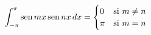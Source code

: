 \item $\displaystyle\int_{-\pi}^{\pi} \operatorname{sen} mx \operatorname{sen} nx \, dx = \begin{cases} 0 & \text{si } m \ne n \\ \pi & \text{si } m = n \end{cases}$
